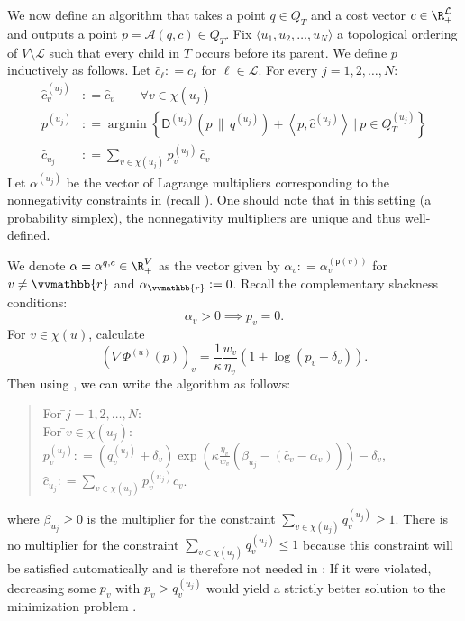 \documentclass{toc}
\newcommand{\bigmid}{~\big|~}
\newcommand{\calA}{\mathcal A}
\newcommand{\calL}{\mathcal L}
\newcommand{\dmid}{\,\|\,}
\newcommand{\vvr}{\vvmathbb{r}}
\newcommand{\seteq}{\mathrel{\mathop:}=}
\newcommand{\sfp}{\mathsf{p}}
\newcommand{\sfD}{\mathsf D}
\newcommand{\llangle}{\left\langle}
\newcommand{\rrangle}{\right\rangle}
\DeclareMathOperator{\argmin}{\mathrm{argmin}}
\begin{document}
We now define an algorithm that takes a point $q \in Q_T$ and a cost vector $c \in \R_+^{\calL}$ and outputs
a point $p = \calA(q,c)\in Q_T$.
Fix $\langle u_1,u_2,\ldots, u_N\rangle$ a topological ordering of $V \setminus \calL$
such that every child in $T$ occurs before its parent.
We define $p$ inductively as follows.
Let $\hat{c}_{\ell} \seteq c_{\ell}$ for $\ell \in \calL$.
For every $j=1,2,\ldots,N$:
\begin{align}
\hat{c}^{(u_j)}_v &\seteq \hat{c}_v \qquad \forall v \in \chi(u_j) \label{eq:hatc}\\
p^{(u_j)} &\seteq \argmin \left\{ \sfD^{(u_j)}\!\left(p \dmid q^{(u_j)}\right) + \llangle p, \hat{c}^{(u_j)} \rrangle \bigmid 
p \in Q^{(u_j)}_T\right\} \label{eq:locp} \\
\hat{c}_{u_j} &\seteq \sum_{v \in \chi(u_j)} p^{(u_j)}_v\,\hat{c}_v \label{eq:hatc2}
\end{align}
Let $\alpha^{(u_j)}$ be
the vector of Lagrange multipliers corresponding to the nonnegativity constraints in 
(recall ).
One should note that in this setting (a probability simplex), the nonnegativity multipliers are unique
and thus well-defined.

We denote $\alpha = \alpha^{q,c} \in \R_+^{V}$ as the vector given by $\alpha_v \seteq \alpha^{(\sfp(v))}_v$ for $v \neq \vvr$
and $\alpha_{\vvr} \seteq 0$.
Recall the complementary slackness conditions:
\begin{equation}\label{eq:posmult}
\alpha_v > 0 \implies p_v = 0.
\end{equation}
For $v \in \chi(u)$, calculate
\[
\left(\nabla \Phi^{(u)}(p)\right)_v = \frac{1}{\kappa} \frac{w_v}{\eta_v} \left(1+\log(p_v+\delta_v)\right).
\]
Then using , we can write the algorithm as follows:
\begin{quote}
	\begin{tabbing}
		For \=$j=1,2,\ldots,N$: \\[0.1cm]
		\>For \=$v \in \chi(u_j)$: \\[0.1cm]
		\>\>$p^{(u_j)}_v \seteq (q^{(u_j)}_v+\delta_v) \exp\left(\kappa \frac{\eta_v}{w_v} \left(\beta_{u_j} - (\hat{c}_v - \alpha_v)\right)\right)- \delta_v$, \\[0.1cm]
		\>$\hat{c}_{u_j} \seteq \sum_{v \in \chi(u_j)} p_v^{(u_j)} \hat{c}_v$.
	\end{tabbing}
\end{quote}
where $\beta_{u_j}\ge 0$ is the multiplier for the constraint $\sum_{v \in \chi(u_j)} q^{(u_j)}_v \geq 1$. There is no multiplier for the constraint $\sum_{v \in \chi(u_j)} q_v^{(u_j)} \leq 1$ because this constraint will be satisfied automatically and is therefore not needed in : If it were violated, decreasing some $p_v$ with $p_v>q_v^{(u_j)}$ would yield a strictly better solution to the minimization problem .
\end{document}
